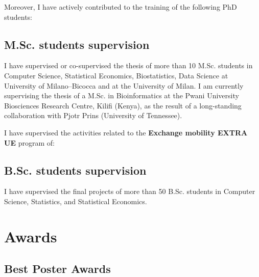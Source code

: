 \documentclass[11pt,a4paper,roman]{moderncv}
\begin{document}
Moreover, I have actively contributed to the training of the following
PhD students:


\subsection{M.Sc. students supervision}

  I have supervised or co-supervised the thesis of more than 10 M.Sc.
  students  in Computer Science, Statistical Economics, Biostatistics,
  Data Science at University of Milano--Bicocca and at the University of Milan.
  I am currently supervising the thesis of a M.Sc. in Bioinformatics at the
Pwani University Biosciences Research Centre, Kilifi (Kenya), as the result of a
long-standing collaboration with Pjotr Prins (University of Tennessee).




  I have supervised the activities related to the
  \textbf{Exchange mobility EXTRA UE} program of:


  \subsection{B.Sc. students supervision}

  I have supervised the final projects of more than 50 B.Sc. students in
  Computer Science, Statistics, and Statistical Economics.

\section{Awards}

\subsection{Best Poster Awards}
\end{document}
